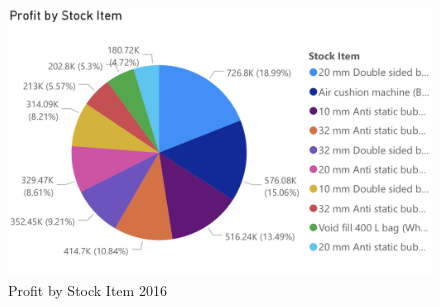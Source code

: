 \documentclass[12pt]{article}
\begin{document}
\begin{figure}[H]
    \centering
    \includegraphics [width=17.5cm]
    {images/Sales/Profit by Stock Item2016.png}
    \caption{Profit by Stock Item 2016}
    \label{Profit by Stock Item 2016}
\end{figure}
\end{document}
